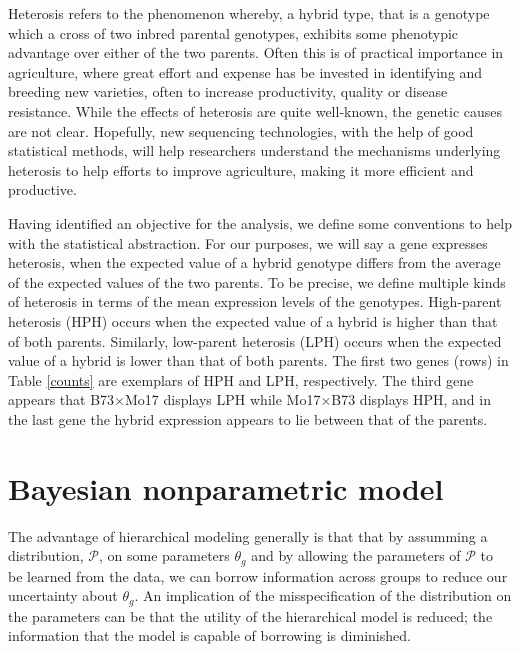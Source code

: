 Heterosis refers to the phenomenon whereby, a hybrid type, that is a genotype which a cross of two inbred parental genotypes, exhibits some phenotypic advantage over either of the two parents. Often this is of practical importance in agriculture, where great effort and expense has be invested in identifying and breeding new varieties, often to increase productivity, quality or disease resistance. While the effects of heterosis are quite well-known, the genetic causes are not clear. Hopefully, new sequencing technologies, with the help of good statistical methods, will help researchers understand the mechanisms underlying heterosis to help efforts to improve agriculture, making it more efficient and productive.


Having identified an objective for the analysis, we define some conventions to help with the statistical abstraction. For our purposes, we will say a gene expresses heterosis, when the expected value of a hybrid genotype differs from the average of the expected values of the two parents. To be precise, we define multiple kinds of heterosis in terms of the mean expression levels of the genotypes. High-parent heterosis (HPH) occurs when the expected value of a hybrid is higher than that of both parents. Similarly, low-parent heterosis (LPH) occurs when the expected value of a hybrid is lower than that of both parents. The first two genes (rows) in Table \ref{counts} are exemplars of HPH and LPH, respectively. The third gene appears that B73$\times$Mo17 displays LPH while Mo17$\times$B73 displays HPH, and in the last gene the hybrid expression appears to lie between that of the parents.

\section{Bayesian nonparametric model}
The advantage of hierarchical modeling generally is that that by assumming a distribution, $\mathcal{P}$, on some parameters $\theta_g$ and by allowing the parameters of $\mathcal{P}$ to be learned from the data, we can borrow information across groups to reduce our uncertainty about $\theta_g$. An implication of the misspecification of the distribution on the parameters can be that the utility of the hierarchical model is reduced; the information that the model is capable of borrowing is diminished.


